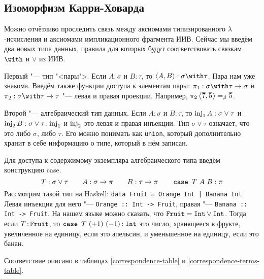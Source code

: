\subsection{\texorpdfstring{Изоморфизм Карри-Ховарда}{Curry-Howard correspondence}}

Можно отчётливо проследить связь между аксиомами типизированного $\lambda$-исчисления и аксиомами импликационного фрагмента ИИВ.
Сейчас мы введём два новых типа данных, правила для которых будут соответствовать связкам $\with$ и $\lor$ из ИИВ.

Первый "--- тип "<пары">. Если $A : \sigma$ и $B : \tau$, то $\pair{A,B} : \sigma \with \tau$. Пара нам уже знакома.
Введём также функции доступа к элементам пары: $\pi_1 : \sigma\with\tau\rightarrow\sigma$ и $\pi_2 : \sigma\with\tau\rightarrow\tau$
"--- левая и правая проекции.
Например, $\pi_2 \left<\overline 7,\overline 5\right> =_\beta \overline 5$.

Второй "--- алгебраический тип данных. Если $A : \sigma$ и $B : \tau$, то $\operatorname{inj}_1 A : \sigma \vee \tau$ и $\operatorname{inj}_2 B : \sigma \vee \tau$.
$\operatorname{inj}_1$ и $\operatorname{inj}_2$ это левая и правая инъекции.
Тип $\sigma \vee \tau$ означает, что это либо $\sigma$, либо $\tau$.
Его можно понимать как \texttt{union}, который дополнительно хранит в себе информацию о типе, который в нём записан.

Для доступа к содержимому экземпляра алгебраического типа введём конструкцию case.
\[
T : \sigma \vee \tau \qquad A : \sigma \rightarrow \pi \qquad B : \tau \rightarrow \pi \qquad \mathinner{\mathtt{case}}~T~A~B : \pi
\]
Рассмотрим такой тип на Haskell: \texttt{data Fruit = Orange Int | Banana Int}. Левая инъекция для него "---
\texttt{Orange :: Int -> Fruit}, правая "--- \texttt{Banana :: Int -> Fruit}.
На нашем языке можно сказать, что $\mathinner\mathtt{Fruit} = \mathinner{\mathtt{Int}} \vee \mathinner{\mathtt{Int}}$.
Тогда если $T \mathinner{:} \mathtt{Fruit}$, то $\mathinner{\mathtt{case}}~T~(+1)~(-1) \mathinner{:} \mathrel{\mathtt{Int}}$ это число,
хранящееся в фрукте, увеличенное на единицу, если это апельсин, и уменьшенное на единицу, если это банан.

Соответствие описано в таблицах \ref{correspondence-table} и \ref{correspondence-terms-table}.

